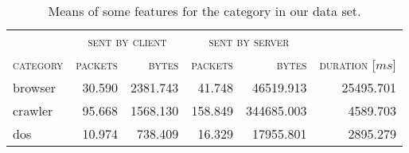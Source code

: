 \begin{table}[H]
	\centering
	\begin{tabular}{lrrrrr}
		\toprule
		 & \multicolumn{2}{c}{\textsc{sent by client}} & \multicolumn{2}{c}{\textsc{sent by server}}\\
		\cmidrule(lr){2-3}
		\cmidrule(lr){4-5}
		\textsc{category} & \textsc{packets} & \textsc{bytes} & \textsc{packets} & \textsc{bytes} & \textsc{duration} [$ms$]\\
		\midrule
		browser & 30.590 & 2381.743 & 41.748 & 46519.913 & 25495.701\\
		crawler & 95.668 & 1568.130 & 158.849 & 344685.003 & 4589.703\\
		dos & 10.974 & 738.409 & 16.329 & 17955.801 & 2895.279\\
		\bottomrule
	\end{tabular}
	\caption{Means of some features for the category in our data set.}
	\label{tab:means_category}
\end{table}
